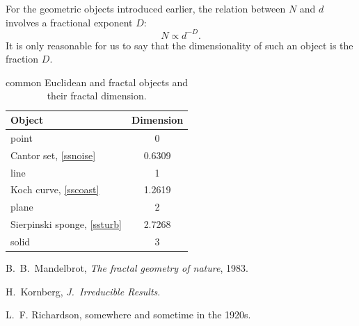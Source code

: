 \documentclass[11pt,a4paper]{article}
\begin{document}
For the geometric objects introduced earlier, the relation between $
N$ and $d$ involves a fractional exponent $D$:
\begin{equation}
	N\propto d^{-D}.
	\label{eqf}
\end{equation}
It is only reasonable for us to say that the 
dimensionality of such an object is the fraction $D$.
\begin{table}
	\caption{common Euclidean and fractal objects and their fractal 
	dimension.}
	\label{T:dimens}
	\begin{center}
        \begin{tabular}{lc}
            \hline
            Object & Dimension  \\
            \hline
            point & 0  \\
            Cantor set, \cref{ssnoise} & 0.6309  \\
            line & 1  \\
            Koch curve, \cref{sscoast} & 1.2619  \\
            plane & 2  \\
            Sierpinski sponge, \cref{ssturb} & 2.7268  \\
            solid & 3  \\
            \hline
        \end{tabular}
	\end{center}
\end{table}

\begin{thebibliography}{99}
	  B.~B.~Mandelbrot, \emph{The fractal geometry of 
	nature}, 1983.

	  H.~Kornberg, \emph{J.\ Irreducible Results}.

	 L.~F. Richardson, somewhere and sometime in the 
	1920s.
\end{thebibliography}
\end{document}
